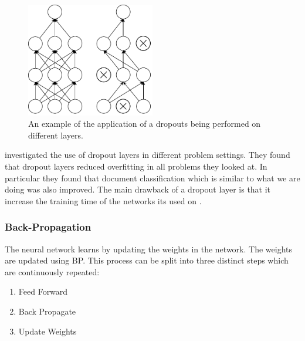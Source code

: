 \begin{description}
        \begin{figure}
            \centering
            \includegraphics[width=0.5\textwidth]{./pictures/method/dropout}
            \caption{An example of the application of a dropouts being performed
                on different layers.}
            \label{fig:dropout}
        \end{figure}

        \citet{JMLR:v15:srivastava14a} investigated the use of dropout
        layers in different problem settings. They found that dropout layers
        reduced overfitting in all problems they looked at. In particular
        they found that document classification which is similar to what we
        are doing was also improved. The main drawback of a dropout layer
        is that it increase the training time of the networks its used on
        \citep{JMLR:v15:srivastava14a}.

\end{description}


\subsubsection{Back-Propagation}\label{sec:BP}

The neural network learns by updating the weights in the network. The weights
are updated using \gls{BP}. This process can be split into three distinct steps
which are continuously repeated:

\begin{enumerate}
    \item Feed Forward
    \item Back Propagate
    \item Update Weights
\end{enumerate}

